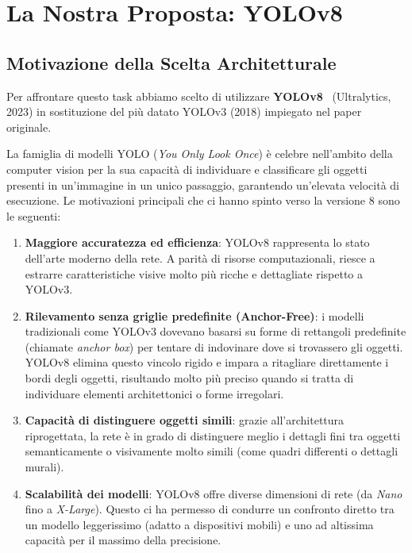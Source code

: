 \documentclass[a4paper,12pt]{report}
\begin{document}
\section{La Nostra Proposta: YOLOv8}

\subsection{Motivazione della Scelta Architetturale}

Per affrontare questo task abbiamo scelto di utilizzare \textbf{YOLOv8}~\cite{yolov8} (Ultralytics, 2023) in sostituzione del più datato YOLOv3 (2018) impiegato nel paper originale. 

La famiglia di modelli YOLO (\emph{You Only Look Once}) è celebre nell'ambito della computer vision per la sua capacità di individuare e classificare gli oggetti presenti in un'immagine in un unico passaggio, garantendo un'elevata velocità di esecuzione. Le motivazioni principali che ci hanno spinto verso la versione 8 sono le seguenti:

\begin{enumerate}
    \item \textbf{Maggiore accuratezza ed efficienza}: YOLOv8 rappresenta lo stato dell'arte moderno della rete. A parità di risorse computazionali, riesce a estrarre caratteristiche visive molto più ricche e dettagliate rispetto a YOLOv3.
    
    \item \textbf{Rilevamento senza griglie predefinite (Anchor-Free)}: i modelli tradizionali come YOLOv3 dovevano basarsi su forme di rettangoli predefinite (chiamate \emph{anchor box}) per tentare di indovinare dove si trovassero gli oggetti. YOLOv8 elimina questo vincolo rigido e impara a ritagliare direttamente i bordi degli oggetti, risultando molto più preciso quando si tratta di individuare elementi architettonici o forme irregolari.
    
    \item \textbf{Capacità di distinguere oggetti simili}: grazie all'architettura riprogettata, la rete è in grado di distinguere meglio i dettagli fini tra oggetti semanticamente o visivamente molto simili (come quadri differenti o dettagli murali).
    
    \item \textbf{Scalabilità dei modelli}: YOLOv8 offre diverse dimensioni di rete (da \emph{Nano} fino a \emph{X-Large}). Questo ci ha permesso di condurre un confronto diretto tra un modello leggerissimo (adatto a dispositivi mobili) e uno ad altissima capacità per il massimo della precisione.
\end{enumerate}
\end{document}
